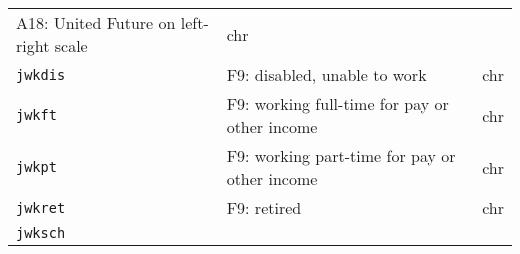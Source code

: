 \documentclass[]{article}
\begin{document}
\begin{longtable}[]{@{}lll@{}}
\begin{minipage}[t]{0.70\columnwidth}
A18: United Future on left-right scale\strut
\end{minipage} & \begin{minipage}[t]{0.08\columnwidth}\raggedright\strut
chr\strut
\end{minipage}\tabularnewline
\begin{minipage}[t]{0.14\columnwidth}\raggedright\strut
\texttt{jwkdis}\strut
\end{minipage} & \begin{minipage}[t]{0.70\columnwidth}\raggedright\strut
F9: disabled, unable to work\strut
\end{minipage} & \begin{minipage}[t]{0.08\columnwidth}\raggedright\strut
chr\strut
\end{minipage}\tabularnewline
\begin{minipage}[t]{0.14\columnwidth}\raggedright\strut
\texttt{jwkft}\strut
\end{minipage} & \begin{minipage}[t]{0.70\columnwidth}\raggedright\strut
F9: working full-time for pay or other income\strut
\end{minipage} & \begin{minipage}[t]{0.08\columnwidth}\raggedright\strut
chr\strut
\end{minipage}\tabularnewline
\begin{minipage}[t]{0.14\columnwidth}\raggedright\strut
\texttt{jwkpt}\strut
\end{minipage} & \begin{minipage}[t]{0.70\columnwidth}\raggedright\strut
F9: working part-time for pay or other income\strut
\end{minipage} & \begin{minipage}[t]{0.08\columnwidth}\raggedright\strut
chr\strut
\end{minipage}\tabularnewline
\begin{minipage}[t]{0.14\columnwidth}\raggedright\strut
\texttt{jwkret}\strut
\end{minipage} & \begin{minipage}[t]{0.70\columnwidth}\raggedright\strut
F9: retired\strut
\end{minipage} & \begin{minipage}[t]{0.08\columnwidth}\raggedright\strut
chr\strut
\end{minipage}\tabularnewline
\begin{minipage}[t]{0.14\columnwidth}\raggedright\strut
\texttt{jwksch}\strut
\end{minipage} & \begin{minipage}[t]{0.70\columnwidth}\raggedright\strut

\end{minipage}
\end{longtable}
\end{document}
